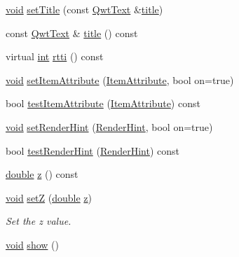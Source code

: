 \begin{DoxyCompactItemize}
\item 
\hyperlink{group___u_a_v_objects_plugin_ga444cf2ff3f0ecbe028adce838d373f5c}{void} \hyperlink{class_qwt_plot_item_a2db3214b23b78274fa6f8c0321a76839}{set\-Title} (const \hyperlink{class_qwt_text}{Qwt\-Text} \&\hyperlink{class_qwt_plot_item_a3859d011b670b5f89e45d1ccef9206f7}{title})
\item 
const \hyperlink{class_qwt_text}{Qwt\-Text} \& \hyperlink{class_qwt_plot_item_a3859d011b670b5f89e45d1ccef9206f7}{title} () const 
\item 
virtual \hyperlink{ioapi_8h_a787fa3cf048117ba7123753c1e74fcd6}{int} \hyperlink{class_qwt_plot_item_af153b5a40a60ac626f1c58e69fc4ecad}{rtti} () const 
\item 
\hyperlink{group___u_a_v_objects_plugin_ga444cf2ff3f0ecbe028adce838d373f5c}{void} \hyperlink{class_qwt_plot_item_a5a335be8ff488809a2cf7f4b734ad1b6}{set\-Item\-Attribute} (\hyperlink{class_qwt_plot_item_ae0fabcdd35f4818ce5bbe019b0eed062}{Item\-Attribute}, bool on=true)
\item 
bool \hyperlink{class_qwt_plot_item_aef70936d34ef661876692e6a06d4a464}{test\-Item\-Attribute} (\hyperlink{class_qwt_plot_item_ae0fabcdd35f4818ce5bbe019b0eed062}{Item\-Attribute}) const 
\item 
\hyperlink{group___u_a_v_objects_plugin_ga444cf2ff3f0ecbe028adce838d373f5c}{void} \hyperlink{class_qwt_plot_item_acd023c40f659c304ded324942865edc8}{set\-Render\-Hint} (\hyperlink{class_qwt_plot_item_abe0e8a39aceef9a600b73e02550a9704}{Render\-Hint}, bool on=true)
\item 
bool \hyperlink{class_qwt_plot_item_ad4009381d6a26359125549e1cf874b69}{test\-Render\-Hint} (\hyperlink{class_qwt_plot_item_abe0e8a39aceef9a600b73e02550a9704}{Render\-Hint}) const 
\item 
\hyperlink{_super_l_u_support_8h_a8956b2b9f49bf918deed98379d159ca7}{double} \hyperlink{class_qwt_plot_item_a4c58d814336643190b9f2918f80c30df}{z} () const 
\item 
\hyperlink{group___u_a_v_objects_plugin_ga444cf2ff3f0ecbe028adce838d373f5c}{void} \hyperlink{class_qwt_plot_item_a57d90e4146133b59d589c71b3a643e82}{set\-Z} (\hyperlink{_super_l_u_support_8h_a8956b2b9f49bf918deed98379d159ca7}{double} \hyperlink{glext_8h_a642c8d69fd1a54f255c898df4f0dd7ca}{z})
\begin{DoxyCompactList}\small\item\em Set the z value. \end{DoxyCompactList}\item 
\hyperlink{group___u_a_v_objects_plugin_ga444cf2ff3f0ecbe028adce838d373f5c}{void} \hyperlink{class_qwt_plot_item_a93a50fb9c86bc66617e28315e02281c3}{show} ()

\end{DoxyCompactItemize}
